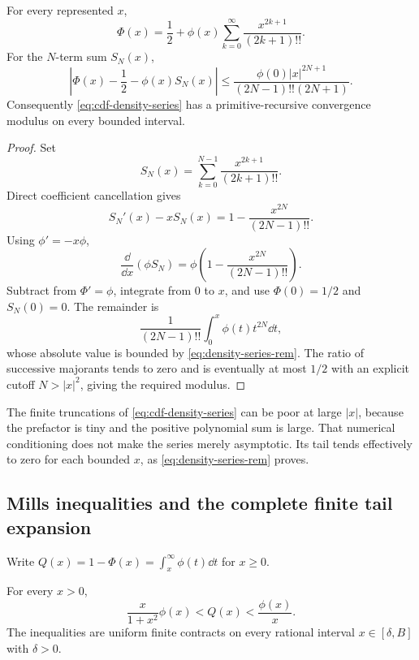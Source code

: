 \begin{theorem}\label{thm:cdf-density-series}
For every represented $x$,
\begin{equation}\label{eq:cdf-density-series}
 \Phi(x)=\frac12+\phi(x)
   \sum_{k=0}^{\infty}\frac{x^{2k+1}}{(2k+1)!!}.
\end{equation}
For the $N$-term sum $S_N(x)$,
\begin{equation}\label{eq:density-series-rem}
 \left|\Phi(x)-\frac12-\phi(x)S_N(x)\right|
 \le \frac{\phi(0)|x|^{2N+1}}{(2N-1)!!(2N+1)}.
\end{equation}
Consequently \eqref{eq:cdf-density-series} has a primitive-recursive convergence modulus on every bounded interval.
\end{theorem}

\begin{proof}
Set
\[
 S_N(x)=\sum_{k=0}^{N-1}\frac{x^{2k+1}}{(2k+1)!!}.
\]
Direct coefficient cancellation gives
\[
 S_N'(x)-xS_N(x)=1-\frac{x^{2N}}{(2N-1)!!}.
\]
Using $\phi'=-x\phi$,
\[
 \frac{\dd}{\dd x}(\phi S_N)
 =\phi\left(1-\frac{x^{2N}}{(2N-1)!!}\right).
\]
Subtract from $\Phi'=\phi$, integrate from $0$ to $x$, and use $\Phi(0)=1/2$ and $S_N(0)=0$.  The remainder is
\[
 \frac1{(2N-1)!!}\int_0^x \phi(t)t^{2N}\dd t,
\]
whose absolute value is bounded by \eqref{eq:density-series-rem}.  The ratio of successive majorants tends to zero and is eventually at most $1/2$ with an explicit cutoff $N>|x|^2$, giving the required modulus.
\end{proof}

\begin{remark}
The finite truncations of \eqref{eq:cdf-density-series} can be poor at large $|x|$, because the prefactor is tiny and the positive polynomial sum is large.  That numerical conditioning does not make the series merely asymptotic.  Its tail tends effectively to zero for each bounded $x$, as \eqref{eq:density-series-rem} proves.
\end{remark}

\subsection{Mills inequalities and the complete finite tail expansion}

Write $Q(x)=1-\Phi(x)=\int_x^\infty\phi(t)\dd t$ for $x\ge0$.

\begin{theorem}\label{thm:mills}
For every $x>0$,
\begin{equation}\label{eq:mills}
 \frac{x}{1+x^2}\phi(x)<Q(x)<\frac{\phi(x)}{x}.
\end{equation}
The inequalities are uniform finite contracts on every rational interval $x\in[\delta,B]$ with $\delta>0$.
\end{theorem}

